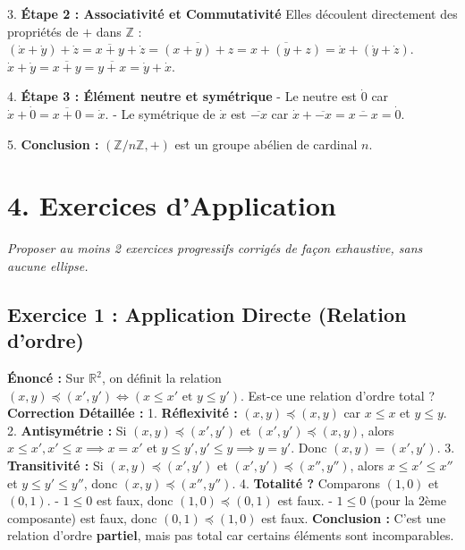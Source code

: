\documentclass{report}
\begin{document}
3. \textbf{Étape 2 : Associativité et Commutativité}
   Elles découlent directement des propriétés de $+$ dans $\mathbb{Z}$ :
   $(\dot{x} + \dot{y}) + \dot{z} = \overline{x+y} + \dot{z} = \overline{(x+y)+z} = \overline{x+(y+z)} = \dot{x} + (\dot{y} + \dot{z})$.
   $\dot{x} + \dot{y} = \overline{x+y} = \overline{y+x} = \dot{y} + \dot{x}$.

4. \textbf{Étape 3 : Élément neutre et symétrique}
   - Le neutre est $\dot{0}$ car $\dot{x} + \dot{0} = \overline{x+0} = \dot{x}$.
   - Le symétrique de $\dot{x}$ est $\overline{-x}$ car $\dot{x} + \overline{-x} = \overline{x-x} = \dot{0}$.

5. \textbf{Conclusion :} $(\mathbb{Z}/n\mathbb{Z}, +)$ est un groupe abélien de cardinal $n$.

\section*{4. Exercices d'Application}
\textit{Proposer au moins 2 exercices progressifs corrigés de façon exhaustive, sans aucune ellipse.}

\subsection*{Exercice 1 : Application Directe (Relation d'ordre)}
\textbf{Énoncé :} Sur $\mathbb{R}^2$, on définit la relation $(x,y) \preceq (x',y') \iff (x \le x' \text{ et } y \le y')$. Est-ce une relation d'ordre total ?
\textbf{Correction Détaillée :}
1. \textbf{Réflexivité :} $(x,y) \preceq (x,y)$ car $x \le x$ et $y \le y$.
2. \textbf{Antisymétrie :} Si $(x,y) \preceq (x',y')$ et $(x',y') \preceq (x,y)$, alors $x \le x', x' \le x \implies x = x'$ et $y \le y', y' \le y \implies y = y'$. Donc $(x,y) = (x',y')$.
3. \textbf{Transitivité :} Si $(x,y) \preceq (x',y')$ et $(x',y') \preceq (x'',y'')$, alors $x \le x' \le x''$ et $y \le y' \le y''$, donc $(x,y) \preceq (x'',y'')$.
4. \textbf{Totalité ?} Comparons $(1,0)$ et $(0,1)$.
   - $1 \le 0$ est faux, donc $(1,0) \preceq (0,1)$ est faux.
   - $1 \le 0$ (pour la 2ème composante) est faux, donc $(0,1) \preceq (1,0)$ est faux.
\textbf{Conclusion :} C'est une relation d'ordre \textbf{partiel}, mais pas total car certains éléments sont incomparables.
\end{document}

